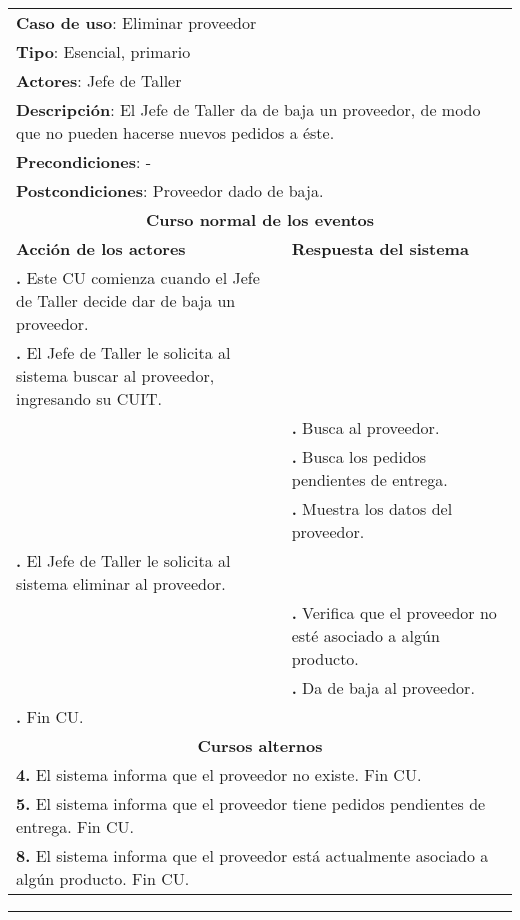 \documentclass[12pt]{extarticle}
\begin{document}


    \newcommand\inc{\stepcounter{step}\textbf{\thestep. }}
    \newcommand\resetinc{\setcounter{step}{0}}

    \newcommand\raya{\noindent\rule{169mm}{0.8mm}\\}

	\begin{longtable}{ |p{8cm}|p{8cm}| }
		\hline
		\multicolumn{2}{|p{16cm}|}{\textbf{Caso de uso}: Eliminar proveedor}\\
		\multicolumn{2}{|p{16cm}|}{\textbf{Tipo}: Esencial, primario}\\
		\multicolumn{2}{|p{16cm}|}{\textbf{Actores}: Jefe de Taller}\\
		\multicolumn{2}{|p{16cm}|}{\textbf{Descripción}: El Jefe de Taller da de baja un proveedor, de modo que no pueden hacerse nuevos pedidos a éste.}\\
		\multicolumn{2}{|p{16cm}|}{\textbf{Precondiciones}: -}\\
		\multicolumn{2}{|p{16cm}|}{\textbf{Postcondiciones}: Proveedor dado de baja.}\\
		\hline
		\multicolumn{2}{|c|}{\textbf{Curso normal de los eventos}}\\
		\hline
		\textbf{Acción de los actores} & \textbf{Respuesta del sistema}\\
		\hline
			\inc Este CU comienza cuando el Jefe de Taller decide dar de baja un proveedor.& \\
			\hline
			\inc  El Jefe de Taller le solicita al sistema buscar al proveedor, ingresando su CUIT. & \\
			\hline
			& \inc Busca al proveedor.\\
			\hline
			& \inc Busca los pedidos pendientes de entrega. \\
			\hline
			& \inc Muestra los datos del proveedor. \\
			\hline
			\inc El Jefe de Taller le solicita al sistema eliminar al proveedor.&\\
			\hline
      & \inc Verifica que el proveedor no esté asociado a algún producto. \\
      \hline
			& \inc Da de baja al proveedor.\\
			\hline
			\inc Fin CU. & \\
		\hline
		\multicolumn{2}{|c|}{\textbf{Cursos alternos}}\\
		\hline
		\multicolumn{2}{|p{16cm}|}{\textbf{4. }El sistema informa que el proveedor no existe. Fin CU.}\\
		\hline
		\multicolumn{2}{|p{16cm}|}{\textbf{5. }El sistema informa que el proveedor tiene pedidos pendientes de entrega. Fin CU.}\\
		\hline
    \multicolumn{2}{|p{16cm}|}{\textbf{8. }El sistema informa que el proveedor está actualmente asociado a algún producto. Fin CU.}\\
    \hline
	\end{longtable}

    \setcounter{step}{0}

    \noindent\rule{169mm}{0.8mm}\\
\end{document}
